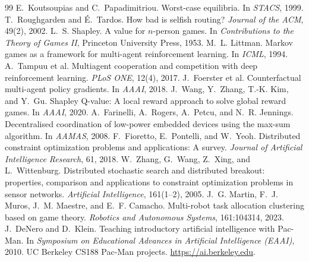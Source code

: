 \documentclass{article}
\begin{document}
\begin{thebibliography}{99}
\small
{} E.~Koutsoupias and C.~Papadimitriou. Worst-case equilibria. In \emph{STACS}, 1999.
 T.~Roughgarden and \'E.~Tardos. How bad is selfish routing? \emph{Journal of the ACM}, 49(2), 2002.
 L.~S. Shapley. A value for $n$-person games. In \emph{Contributions to the Theory of Games II}, Princeton University Press, 1953.
 M.~L. Littman. Markov games as a framework for multi-agent reinforcement learning. In \emph{ICML}, 1994.
 A.~Tampuu et al. Multiagent cooperation and competition with deep reinforcement learning. \emph{PLoS ONE}, 12(4), 2017.
 J.~Foerster et al. Counterfactual multi-agent policy gradients. In \emph{AAAI}, 2018.
 J.~Wang, Y.~Zhang, T.-K. Kim, and Y.~Gu. Shapley Q-value: A local reward approach to solve global reward games. In \emph{AAAI}, 2020.
 A.~Farinelli, A.~Rogers, A.~Petcu, and N.~R. Jennings. Decentralised coordination of low-power embedded devices using the max-sum algorithm. In \emph{AAMAS}, 2008.
 F.~Fioretto, E.~Pontelli, and W.~Yeoh. Distributed constraint optimization problems and applications: A survey. \emph{Journal of Artificial Intelligence Research}, 61, 2018.
 W.~Zhang, G.~Wang, Z.~Xing, and L.~Wittenburg. Distributed stochastic search and distributed breakout: properties, comparison and applications to constraint optimization problems in sensor networks. \emph{Artificial Intelligence}, 161(1--2), 2005.
 J.~G. Martin, F.~J. Muros, J.~M. Maestre, and E.~F. Camacho. Multi-robot task allocation clustering based on game theory. \emph{Robotics and Autonomous Systems}, 161:104314, 2023.
 J.~DeNero and D.~Klein. Teaching introductory artificial intelligence with Pac-Man. In \emph{Symposium on Educational Advances in Artificial Intelligence (EAAI)}, 2010.
 UC Berkeley CS188 Pac-Man projects. \url{https://ai.berkeley.edu}.
\end{thebibliography}
\end{document}
